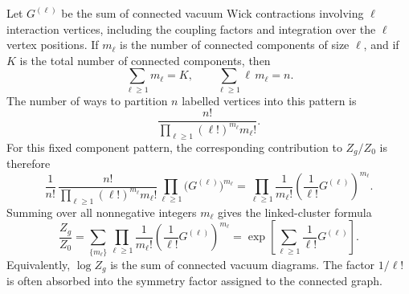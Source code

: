 Let \(G^{(\ell)}\) be the sum of connected vacuum Wick contractions involving
\(\ell\) interaction vertices, including the coupling factors and integration
over the \(\ell\) vertex positions. If \(m_\ell\) is the number of connected
components of size \(\ell\), and if \(K\) is the total number of connected
components, then
\[
  \sum_{\ell\ge1}m_\ell=K,
  \qquad
  \sum_{\ell\ge1}\ell\,m_\ell=n.
\]
The number of ways to partition \(n\) labelled vertices into this pattern is
\[
  \frac{n!}{\prod_{\ell\ge1}(\ell!)^{m_\ell}m_\ell!}.
\]
For this fixed component pattern, the corresponding contribution to
\(Z_g/Z_0\) is therefore
\[
  \frac{1}{n!}\,
  \frac{n!}{\prod_{\ell\ge1}(\ell!)^{m_\ell}m_\ell!}
  \prod_{\ell\ge1}\bigl(G^{(\ell)}\bigr)^{m_\ell}
  =
  \prod_{\ell\ge1}
  \frac{1}{m_\ell!}
  \left(\frac{1}{\ell!}G^{(\ell)}\right)^{m_\ell}.
\]
Summing over all nonnegative integers \(m_\ell\) gives the linked-cluster
formula
\[
  \frac{Z_g}{Z_0}
  =
  \sum_{\{m_\ell\}}
  \prod_{\ell\ge1}
  \frac{1}{m_\ell!}
  \left(\frac{1}{\ell!}G^{(\ell)}\right)^{m_\ell}
  =
  \exp\left[
    \sum_{\ell\ge1}\frac{1}{\ell!}G^{(\ell)}
  \right].
\]
Equivalently, \(\log Z_g\) is the sum of connected vacuum diagrams.
The factor \(1/\ell!\) is often absorbed into the symmetry factor assigned to
the connected graph.

